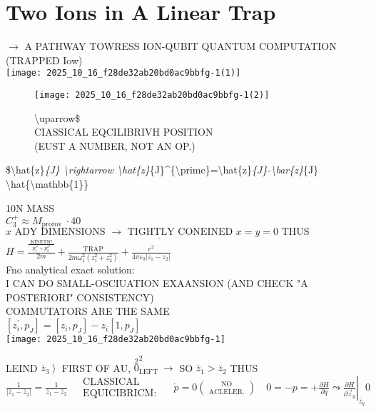 
\captionsetup{singlelinecheck=false}
\section*{Two Ions in A Linear Trap}
$\rightarrow$ A PATHWAY TOWRESS ION-QUBIT QUANTUM COMPUTATION (TRAPPED Iow)\\
\texttt{[image: 2025\_10\_16\_f28de32ab20bd0ac9bbfg-1(1)]}

\begin{figure}[h]
\begin{center}
  \texttt{[image: 2025\_10\_16\_f28de32ab20bd0ac9bbfg-1(2)]}
\captionsetup{labelformat=empty}
\caption{\textbackslash uparrow\$\\
CIASSICAL EQCILIBRIVH POSITION\\
(EUST A NUMBER, NOT AN OP.)}
\end{center}
\end{figure}

\$\textbackslash hat\{z\}\textit{\{J\} \textbackslash rightarrow \textbackslash hat\{z\}}\{J\}\^{}\{\textbackslash prime\}=\textbackslash hat\{z\}\textit{\{J\}-\textbackslash bar\{z\}}\{J\} \textbackslash hat\{\textbackslash mathbb\{1\}\}

10N MASS\\
$C_{3}^{+} \approx M_{\text {prorov }} \cdot 40$\\
$\underline{x \text { ADY DIMENSIONS } \rightarrow \text { TIGHTLY CONEINED } x=y=0 \text { THUS }}$\\
$H=\frac{\frac{\text { KINETIC }}{p_{1}^{z^{2}}+p_{2}^{z^{2}}}}{2 m}+\frac{\text { TRAP }}{2 m \omega_{1}^{2}\left(z_{1}^{2}+z_{2}^{2}\right)}+\frac{e^{2}}{4 \pi \varepsilon_{0}\left|z_{1}-z_{2}\right|}$\\
Fno analytical exact solution:\\
I CAN DO SMALL-OSCIUATION EXAANSION (AND CHECK "A POSTERIORI" CONSISTENCY)\\
COMMUTATORS ARE THE SAME\\
$\left[z_{i}^{\prime}, p_{J}\right]=\left[z_{i}, p_{J}\right]-z_{i}\left[1, p_{J}\right]$\\
\texttt{[image: 2025\_10\_16\_f28de32ab20bd0ac9bbfg-1]}

LEIND $\left.\bar{z}_{3}\right\rangle$ FIRST OF AU, $\stackrel{2}{0}_{\text {LEFT }}^{2} \longrightarrow$ SO $\bar{z}_{1}>\bar{z}_{2}$ THUS $\frac{1}{\left|\bar{z}_{1}-\bar{z}_{2}\right|}=\frac{1}{\bar{z}_{1}-\bar{z}_{2}} \begin{aligned} & \text { CLASSICAL } \\ & \text { EQUICIBRICM: }\end{aligned} \quad \dot{p}=0\binom{\text { NO }}{\text { ACLELER. }} \quad 0=-p=+\left.\frac{\partial H}{\partial q} \leadsto \frac{\partial H}{\partial \vec{z}_{y}}\right|_{\bar{z}_{y}} 0$

